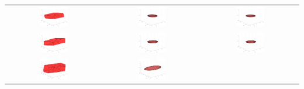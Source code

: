 \documentclass{article}
\begin{document}
\begin{table}[H]
	\centering
	\begin{tabular}{ccc}
		\includegraphics[width=0.3\textwidth]{lk/poly1.pdf} & \includegraphics[width=0.3\textwidth]{lk/ellip1.pdf} &
		\includegraphics[width=0.3\textwidth]{lk/ellip1_conservative.pdf} \\
		\includegraphics[width=0.3\textwidth]{lk/poly2.pdf} & \includegraphics[width=0.3\textwidth]{lk/ellip2.pdf}&
		\includegraphics[width=0.3\textwidth]{lk/ellip2_conservative.pdf} \\
		\includegraphics[width=0.3\textwidth]{lk/poly3.pdf} & \includegraphics[width=0.3\textwidth]{lk/ellip3.pdf}&

\end{tabular}
\end{table}
\end{document}
